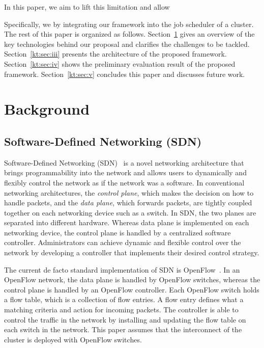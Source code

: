 \documentclass[graybox]{svmult}
\begin{document}
In this paper, we aim to lift this limitation and allow

Specifically, we by integrating our framework
into the job scheduler of a cluster.
The rest of this paper is organized as follows. Section~\ref{kt:sec:ii}
gives an overview of the key technologies behind our proposal and clarifies
the challenges to be tackled. Section~\ref{kt:sec:iii} presents the
architecture of the proposed framework. Section~\ref{kt:sec:iv} shows the
preliminary evaluation result of the proposed framework.
Section~\ref{kt:sec:v} concludes this paper and discusses future work.

\section{Background}\label{kt:sec:ii}

\subsection{Software-Defined Networking (SDN)}

Software-Defined Networking (SDN)~\cite{Jamalian2015} is a novel networking
architecture that brings programmability into the network and allows users to
dynamically and flexibly control the network as if the network was a software.
In conventional networking architectures, the \textit{control plane}, which
makes the decision on how to handle packets, and the \textit {data plane},
which forwards packets, are tightly coupled together on each networking device
such as a switch. In SDN, the two planes are separated into different
hardware. Whereas data plane is implemented on each networking device, the
control plane is handled by a centralized software controller. Administrators
can achieve dynamic and flexible control over the network by developing a
controller that implements their desired control strategy.

The current de facto standard implementation of SDN is
OpenFlow~\cite{McKeown2008}. In an OpenFlow network, the data plane is handled
by OpenFlow switches, whereas the control plane is handled by an OpenFlow
controller. Each OpenFlow switch holds a flow table, which is a collection of
flow entries. A flow entry defines what a matching criteria and action for
incoming packets. The controller is able to control the traffic in the network
by installing and updating the flow table on each switch in the network. This
paper assumes that the interconnect of the cluster is deployed with OpenFlow
switches.
\end{document}
